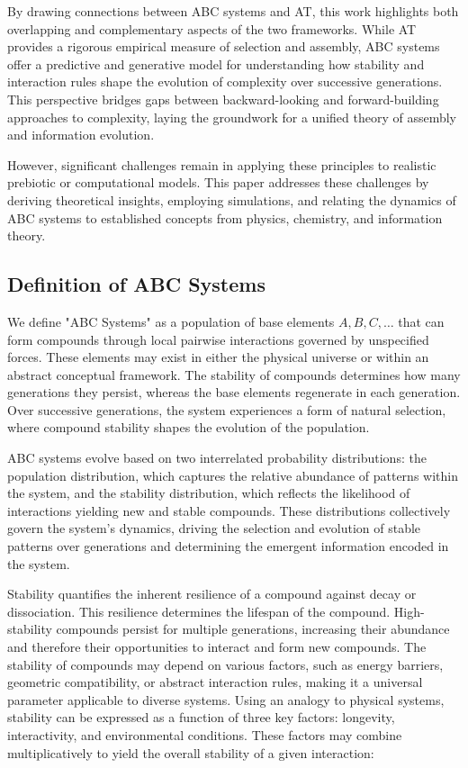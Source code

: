 \documentclass[entropy,article,submit,pdftex,oneauthor]{Definitions/mdpi}
\begin{document}
By drawing connections between ABC systems and AT, this work highlights both overlapping and complementary aspects of the two frameworks. While AT provides a rigorous empirical measure of selection and assembly, ABC systems offer a predictive and generative model for understanding how stability and interaction rules shape the evolution of complexity over successive generations. This perspective bridges gaps between backward-looking and forward-building approaches to complexity, laying the groundwork for a unified theory of assembly and information evolution.

However, significant challenges remain in applying these principles to realistic prebiotic or computational models. This paper addresses these challenges by deriving theoretical insights, employing simulations, and relating the dynamics of ABC systems to established concepts from physics, chemistry, and information theory.


\subsection{Definition of ABC Systems}

We define "ABC Systems" as a population of base elements \( A, B, C, \dots \) that can form compounds through local pairwise interactions governed by unspecified forces. These elements may exist in either the physical universe or within an abstract conceptual framework. The stability of compounds determines how many generations they persist, whereas the base elements regenerate in each generation. Over successive generations, the system experiences a form of natural selection, where compound stability shapes the evolution of the population.

ABC systems evolve based on two interrelated probability distributions: the population distribution, which captures the relative abundance of patterns within the system, and the stability distribution, which reflects the likelihood of interactions yielding new and stable compounds. These distributions collectively govern the system's dynamics, driving the selection and evolution of stable patterns over generations and determining the emergent information encoded in the system.

Stability quantifies the inherent resilience of a compound against decay or dissociation. This resilience determines the lifespan of the compound. High-stability compounds persist for multiple generations, increasing their abundance and therefore their opportunities to interact and form new compounds. The stability of compounds may depend on various factors, such as energy barriers, geometric compatibility, or abstract interaction rules, making it a universal parameter applicable to diverse systems. Using an analogy to physical systems, stability can be expressed as a function of three key factors: longevity, interactivity, and environmental conditions. These factors may combine multiplicatively to yield the overall stability of a given interaction:
\end{document}
